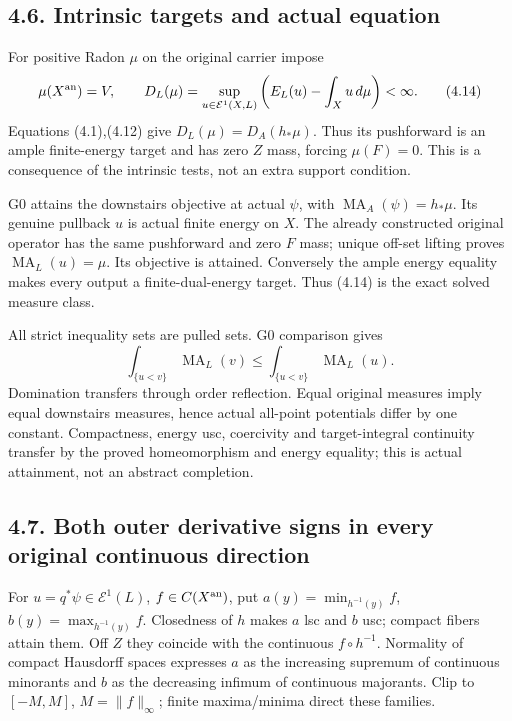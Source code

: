 \documentclass[
  10pt,
]{article}
\begin{document}
\subsection{4.6. Intrinsic targets and actual
equation}\label{intrinsic-targets-and-actual-equation}

For positive Radon \(\mu\) on the original carrier impose
\[\mu(X^{\rm an})=V,\qquad
D_L(\mu)=\sup_{u\in\mathcal E^1(X,L)}
\left(E_L(u)-\int_Xu\,d\mu\right)<\infty. \tag{4.14}\] Equations
(4.1),(4.12) give \(D_L(\mu)=D_A(h_*\mu)\). Thus its pushforward is an
ample finite-energy target and has zero \(Z\) mass, forcing
\(\mu(F)=0\). This is a consequence of the intrinsic tests, not an extra
support condition.

G0 attains the downstairs objective at actual \(\psi\), with
\(\operatorname{MA}_A(\psi)=h_*\mu\). Its genuine pullback \(u\) is
actual finite energy on \(X\). The already constructed original operator
has the same pushforward and zero \(F\) mass; unique off-set lifting
proves \(\operatorname{MA}_L(u)=\mu\). Its objective is attained.
Conversely the ample energy equality makes every output a
finite-dual-energy target. Thus (4.14) is the exact solved measure
class.

All strict inequality sets are pulled sets. G0 comparison gives
\[\int_{\{u<v\}}\operatorname{MA}_L(v)
\le\int_{\{u<v\}}\operatorname{MA}_L(u). \tag{4.15}\] Domination
transfers through order reflection. Equal original measures imply equal
downstairs measures, hence actual all-point potentials differ by one
constant. Compactness, energy usc, coercivity and target-integral
continuity transfer by the proved homeomorphism and energy equality;
this is actual attainment, not an abstract completion.

\subsection{4.7. Both outer derivative signs in every original
continuous
direction}\label{both-outer-derivative-signs-in-every-original-continuous-direction}

For \(u=q^*\psi\in\mathcal E^1(L)\), \(f\in C(X^{\rm an})\), put
\(a(y)=\min_{h^{-1}(y)}f\), \(b(y)=\max_{h^{-1}(y)}f\). Closedness of
\(h\) makes \(a\) lsc and \(b\) usc; compact fibers attain them. Off
\(Z\) they coincide with the continuous \(f\circ h^{-1}\). Normality of
compact Hausdorff spaces expresses \(a\) as the increasing supremum of
continuous minorants and \(b\) as the decreasing infimum of continuous
majorants. Clip to \([-M,M]\), \(M=\|f\|_\infty\); finite maxima/minima
direct these families.
\end{document}
